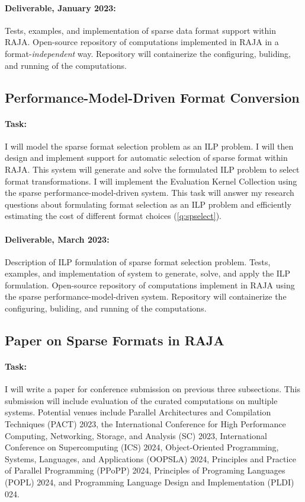 \documentclass{article}
\begin{document}
\paragraph{Deliverable, January 2023:} 
Tests, examples, and implementation of sparse data format support within RAJA. 
Open-source repository of computations implemented in RAJA in a format-\textit{independent} way.
Repository will containerize the configuring, buliding, and running of the computations. 

\subsection{Performance-Model-Driven Format Conversion}

\paragraph{Task:}
I will model the sparse format selection problem as an ILP problem.
I will then design and implement support for automatic selection of sparse format within RAJA.
This system will generate and solve the formulated ILP problem to select format transformations.
I will implement the Evaluation Kernel Collection using the sparse performance-model-driven system.
This task will answer my research questions about formulating format selection as an ILP problem and efficiently estimating the cost of different format choices (\ref{q:spselect}).

\paragraph{Deliverable, March 2023:}
Description of ILP formulation of sparse format selection problem.
Tests, examples, and implementation of system to generate, solve, and apply the ILP formulation.
Open-source repository of computations implement in RAJA using the sparse performance-model-driven system.
Repository will containerize the configuring, buliding, and running of the computations. 

\subsection{Paper on Sparse Formats in RAJA}

\paragraph{Task:}
I will write a paper for conference submission on previous three subsections. 
This submission will include evaluation of the curated computations on multiple systems.
Potential venues include Parallel Architectures and Compilation Techniques (PACT) 2023, the International Conference for High Performance Computing, Networking, Storage, and Analysis (SC) 2023, International Conference on Supercomputing (ICS) 2024,  Object-Oriented Programming, Systems, Languages, and Applications (OOPSLA) 2024, Principles and Practice of Parallel Programming (PPoPP) 2024, Principles of Programing Languages (POPL) 2024, and Programming Language Design and Implementation (PLDI) 024.
\end{document}

